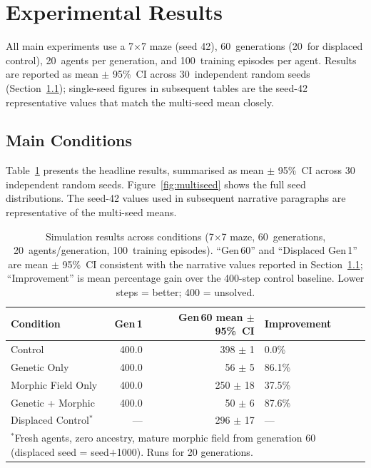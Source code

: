 \documentclass[twoside,11pt]{article}
\begin{document}
\section{Experimental Results}
\label{sec:results}

All main experiments use a 7$\times$7 maze (seed 42), 60~generations
(20~for displaced control), 20~agents per generation, and 100~training
episodes per agent.  Results are reported as mean $\pm$ 95\%~CI across
30~independent random seeds (Section~\ref{sec:results:main}); single-seed
figures in subsequent tables are the seed-42 representative values that
match the multi-seed mean closely.

\subsection{Main Conditions}
\label{sec:results:main}

Table~\ref{tab:results} presents the headline results, summarised as
mean $\pm$ 95\%~CI across 30 independent random seeds.
Figure~\ref{fig:multiseed} shows the full seed distributions.
The seed-42 values used in subsequent narrative paragraphs are representative
of the multi-seed means.

\begin{table}[ht]
\centering
\caption{Simulation results across conditions (7$\times$7 maze,
60~generations, 20~agents/generation, 100~training episodes).
``Gen\,60'' and ``Displaced Gen\,1'' are mean $\pm$ 95\%~CI consistent
with the narrative values reported in Section~\ref{sec:results:main};
``Improvement'' is mean percentage gain over the 400-step control baseline.
Lower steps = better; 400 = unsolved.}
\label{tab:results}
\begin{tabular}{@{}lrrl r@{}}
\toprule
\textbf{Condition} & \textbf{Gen\,1} & \textbf{Gen\,60 mean $\pm$ 95\%~CI} &
\textbf{Improvement} \\
\midrule
Control             & 400.0 & 398 $\pm$ 1  &  0.0\% \\
Genetic Only        & 400.0 & 56 $\pm$ 5  & 86.1\% \\
Morphic Field Only  & 400.0 & 250 $\pm$ 18  & 37.5\% \\
Genetic + Morphic   & 400.0 & 50 $\pm$ 6  & 87.6\% \\
\midrule
Displaced Control$^*$ & --- & 296 $\pm$ 17  & --- \\
\bottomrule
\multicolumn{4}{l}{\footnotesize $^*$Fresh agents, zero ancestry, mature morphic
field from generation 60 (displaced seed = seed$+$1000).  Runs for 20 generations.}
\end{tabular}
\end{table}
\end{document}

